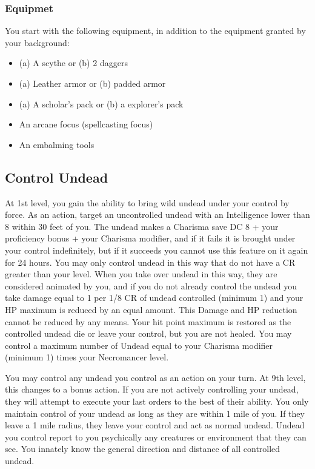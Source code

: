 \documentclass[10pt,twoside,twocolumn,openany]{book}
\begin{document}
\subsubsection{Equipmet}
You start with the following equipment, in addition to the equipment granted by your background:
\begin{itemize}
\item (a) A scythe or (b) 2 daggers
\item (a) Leather armor or (b) padded armor
\item (a) A scholar's pack or (b) a explorer's pack
\item An arcane focus (spellcasting focus)
\item An embalming tools
\end{itemize}

\subsection{Control Undead}
At 1st level, you gain the ability to bring wild undead under your control by force. As an action, target an uncontrolled undead with an Intelligence lower than 8 within 30 feet of you. The undead makes a Charisma save DC 8 + your proficiency bonus + your Charisma modifier, and if it fails it is brought under your control indefinitely, but if it succeeds you cannot use this feature on it again for 24 hours. You may only control undead in this way that do not have a CR greater than your level. When you take over undead in this way, they are considered animated by you, and if you do not already control the undead you take damage equal to 1 per 1/8 CR of undead controlled (minimum 1) and your HP maximum is reduced by an equal amount. This Damage and HP reduction cannot be reduced by any means. Your hit point maximum is restored as the controlled undead die or leave your control, but you are not healed. You may control a maximum number of Undead equal to your Charisma modifier (minimum 1) times your Necromancer level.

You may control any undead you control as an action on your turn. At 9th level, this changes to a bonus action. If you are not actively controlling your undead, they will attempt to execute your last orders to the best of their ability. You only maintain control of your undead as long as they are within 1 mile of you. If they leave a 1 mile radius, they leave your control and act as normal undead.
Undead you control report to you psychically any creatures or environment that they can see. You innately know the general direction and distance of all controlled undead.
\end{document}
